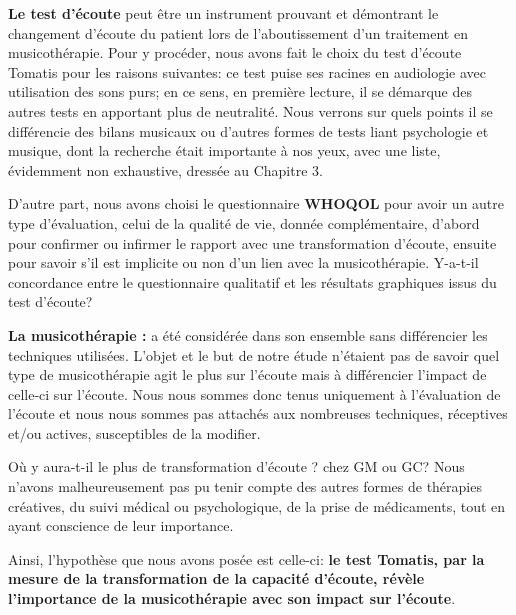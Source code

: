  
 \textbf { Le test d'écoute}  peut être un instrument prouvant et démontrant le changement d'écoute du 
 patient
 lors de l'aboutissement d'un traitement en musicothérapie.
 Pour y procéder, nous  avons fait le choix du test d'écoute Tomatis pour les raisons suivantes:  ce test 
 puise ses racines  en 
 audiologie avec utilisation des sons purs; en ce sens, en première lecture, il se démarque des autres 
 tests en apportant plus de neutralité. Nous verrons sur quels points il se différencie des bilans musicaux 
 ou 
 d'autres formes de tests liant psychologie et musique, dont la recherche était importante à nos yeux, 
 avec une liste, 
 évidemment non exhaustive, dressée au Chapitre 3. 
 
 
 D'autre part, nous avons choisi le questionnaire \textbf {WHOQOL} pour avoir un autre type 
 d'évaluation, celui 
 de la qualité de vie, donnée complémentaire, d'abord  pour confirmer ou infirmer le rapport avec une  
 transformation d'écoute, ensuite pour savoir s'il est implicite  ou non d'un lien avec la musicothérapie.
 Y-a-t-il concordance entre  le questionnaire qualitatif  et les résultats graphiques issus du test d'écoute?
 
  \textbf{La musicothérapie :}  a été considérée dans son ensemble sans 
 différencier les 
 techniques utilisées.
  L'objet et le but de notre étude n'étaient pas de savoir quel  type de 
  musicothérapie 
  agit le plus sur l'écoute mais à différencier l'impact de celle-ci sur l'écoute. Nous nous sommes donc 
  tenus uniquement  à l'évaluation de l'écoute et nous nous sommes pas attachés  aux nombreuses 
  techniques, réceptives et/ou actives, susceptibles de la modifier.

 Où y aura-t-il le plus de transformation d'écoute ? chez GM ou GC?
 Nous n'avons malheureusement pas pu  tenir compte des autres for\-mes de thérapies créatives, du 
 suivi médical ou 
 psychologique, de 
 la prise de médicaments, tout en ayant conscience de leur importance.
 

 
 

 Ainsi, l'hypothèse que nous avons posée est celle-ci: \textbf{le test Tomatis, par la  mesure de la  
 transformation de la capacité d'écoute, révèle  l'importance de la musicothérapie avec son impact sur 
 l'écoute}.

